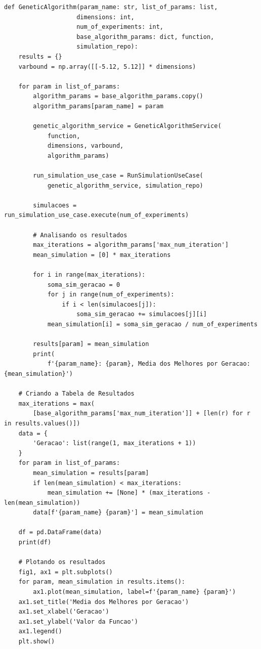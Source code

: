 \documentclass[a4paper, 12pt]{article}
\begin{document}
\begin{lstlisting}[style=python]
def GeneticAlgorithm(param_name: str, list_of_params: list,
                    dimensions: int,
                    num_of_experiments: int,
                    base_algorithm_params: dict, function,
                    simulation_repo):
    results = {}
    varbound = np.array([[-5.12, 5.12]] * dimensions)

    for param in list_of_params:
        algorithm_params = base_algorithm_params.copy()
        algorithm_params[param_name] = param

        genetic_algorithm_service = GeneticAlgorithmService(
            function,
            dimensions, varbound,
            algorithm_params)

        run_simulation_use_case = RunSimulationUseCase(
            genetic_algorithm_service, simulation_repo)

        simulacoes = run_simulation_use_case.execute(num_of_experiments)

        # Analisando os resultados
        max_iterations = algorithm_params['max_num_iteration']
        mean_simulation = [0] * max_iterations

        for i in range(max_iterations):
            soma_sim_geracao = 0
            for j in range(num_of_experiments):
                if i < len(simulacoes[j]):
                    soma_sim_geracao += simulacoes[j][i]
            mean_simulation[i] = soma_sim_geracao / num_of_experiments

        results[param] = mean_simulation
        print(
            f'{param_name}: {param}, Media dos Melhores por Geracao: {mean_simulation}')

    # Criando a Tabela de Resultados
    max_iterations = max(
        [base_algorithm_params['max_num_iteration']] + [len(r) for r in results.values()])
    data = {
        'Geracao': list(range(1, max_iterations + 1))
    }
    for param in list_of_params:
        mean_simulation = results[param]
        if len(mean_simulation) < max_iterations:
            mean_simulation += [None] * (max_iterations - len(mean_simulation))
        data[f'{param_name} {param}'] = mean_simulation

    df = pd.DataFrame(data)
    print(df)

    # Plotando os resultados
    fig1, ax1 = plt.subplots()
    for param, mean_simulation in results.items():
        ax1.plot(mean_simulation, label=f'{param_name} {param}')
    ax1.set_title('Media dos Melhores por Geracao')
    ax1.set_xlabel('Geracao')
    ax1.set_ylabel('Valor da Funcao')
    ax1.legend()
    plt.show()
\end{lstlisting} \\
\end{document}
